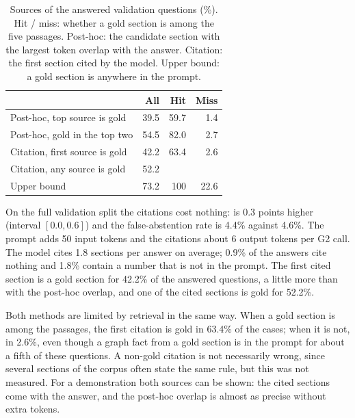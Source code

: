 \begin{table}[ht]
    \centering
    \caption{Sources of the answered validation questions (\%). Hit / miss: whether a gold section
    is among the five passages. Post-hoc: the candidate section with the largest token overlap with
    the answer. Citation: the first section cited by the model. Upper bound: a gold section is
    anywhere in the prompt.}
    \label{tab:sources:main}
    \small
    \begin{tabular}{lrrr}
        \toprule
        & All & Hit & Miss \\
        \midrule
        Post-hoc, top source is gold     & 39.5 & 59.7 &  1.4 \\
        Post-hoc, gold in the top two    & 54.5 & 82.0 &  2.7 \\
        Citation, first source is gold   & 42.2 & 63.4 &  2.6 \\
        Citation, any source is gold     & 52.2 &      &      \\
        Upper bound                      & 73.2 & 100  & 22.6 \\
        \bottomrule
    \end{tabular}
\end{table}

On the full validation split the citations cost nothing: \fone{} is 0.3 points higher
(interval $[0.0, 0.6]$) and the false-abstention rate is 4.4\% against 4.6\%. The prompt adds 50
input tokens and the citations about 6 output tokens per G2 call. The model cites 1.8 sections per
answer on average; 0.9\% of the answers cite nothing and 1.8\% contain a number that is not in the
prompt. The first cited section is a gold section for 42.2\% of the answered questions, a little
more than with the post-hoc overlap, and one of the cited sections is gold for 52.2\%.

Both methods are limited by retrieval in the same way. When a gold section is among the passages,
the first citation is gold in 63.4\% of the cases; when it is not, in 2.6\%, even though a graph fact
from a gold section is in the prompt for about a fifth of these questions. A non-gold citation is
not necessarily wrong, since several sections of the corpus often state the same rule, but this
was not measured. For a demonstration both sources can be shown: the cited sections come with
the answer, and the post-hoc overlap is almost as precise without extra tokens.
